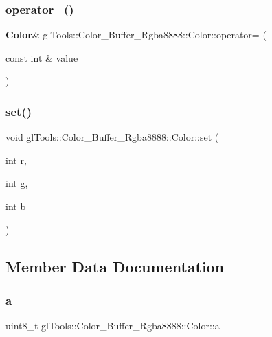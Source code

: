 \subsubsection{operator=()}
{\footnotesize\ttfamily \textbf{ Color}\& gl\+Tools\+::\+Color\+\_\+\+Buffer\+\_\+\+Rgba8888\+::\+Color\+::operator= (\begin{DoxyParamCaption}\item[{const int \&}]{value }\end{DoxyParamCaption})\hspace{0.3cm}{\ttfamily [inline]}}

\mbox{\label{structgl_tools_1_1_color___buffer___rgba8888_1_1_color_a531c334d90937837954f3daefba6dc35}} 
\subsubsection{set()}
{\footnotesize\ttfamily void gl\+Tools\+::\+Color\+\_\+\+Buffer\+\_\+\+Rgba8888\+::\+Color\+::set (\begin{DoxyParamCaption}\item[{int}]{r,  }\item[{int}]{g,  }\item[{int}]{b }\end{DoxyParamCaption})\hspace{0.3cm}{\ttfamily [inline]}}



\subsection{Member Data Documentation}
\mbox{\label{structgl_tools_1_1_color___buffer___rgba8888_1_1_color_a97ba6d391972e2bcffd6abd0bd94c3f7}} 
\subsubsection{a}
{\footnotesize\ttfamily uint8\+\_\+t gl\+Tools\+::\+Color\+\_\+\+Buffer\+\_\+\+Rgba8888\+::\+Color\+::a}

\mbox{\label{structgl_tools_1_1_color___buffer___rgba8888_1_1_color_a980888a1c1b12193e26bd4613319bfe8}} 
